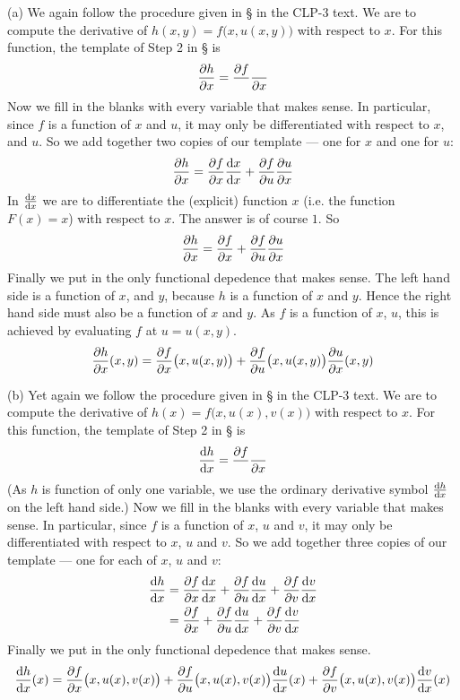 \begin{solution}
(a)
We again follow the procedure given in 
\S{} in the CLP-3 text. We are to compute the
derivative of $h(x,y)=f\big(x,u(x,y)\big)$ with respect to 
$x$. For this function, the template of Step 2 in 
\S{} is
\begin{equation*}
\pdiff{h}{x}=\frac{\partial f}{ }\frac{ }{\partial x}
\end{equation*}
Now we fill in the blanks with every variable that makes sense. In 
particular, since $f$ is a function of $x$ and $u$, it may only be 
differentiated with respect to $x$, and $u$. So we add together
two copies of our template --- one for $x$ and one for $u$:
\begin{align*}
\pdiff{h}{x}=\pdiff{f}{x}\diff{x}{x}
             +\pdiff{f}{u}\pdiff{u}{x}
\end{align*}
In $\diff{x}{x}$ we are to differentiate the (explicit) function $x$
(i.e. the function $F(x)=x$) with respect to $x$. The answer is of 
course $1$. So 
\begin{align*}
\pdiff{h}{x}=\pdiff{f}{x}
             +\pdiff{f}{u}\pdiff{u}{x}
\end{align*} 
Finally we put in the only functional depedence that makes sense. 
The left hand side is a function of $x$, and $y$, because $h$
is a function of $x$ and $y$. Hence the right hand side must 
also be a function of $x$ and $y$. As $f$ is a
function of $x$, $u$, this is achieved by evaluating $f$ at 
$u=u(x,y)$.
\begin{align*}
\pdiff{h}{x}(x,y)
=\pdiff{f}{x}\big(x,u(x,y)\big)
+\pdiff{f}{u}\big(x,u(x,y)\big)
\pdiff{u}{x}(x,y)
\end{align*}


(b) Yet again we follow the procedure given in 
\S{} in the CLP-3 text. We are to compute the
derivative of $h(x)=f\big(x,u(x),v(x)\big)$ with respect to 
$x$. For this function, the template of Step 2 in 
\S{} is
\begin{equation*}
\diff{h}{x}=\frac{\partial f}{ }\frac{ }{\partial x}
\end{equation*}
(As $h$ is function of only one variable, we use the ordinary derivative
symbol $\diff{h}{x}$ on the left hand side.)
Now we fill in the blanks with every variable that makes sense. In 
particular, since $f$ is a function of $x$, $u$ and $v$, it may only be 
differentiated with respect to $x$, $u$ and $v$. So we add together
three copies of our template --- one for each of $x$, $u$ and $v$:
\begin{align*}
\diff{h}{x}&=\pdiff{f}{x}\diff{x}{x}
             +\pdiff{f}{u}\diff{u}{x}
             +\pdiff{f}{v}\diff{v}{x} \\
            &=\pdiff{f}{x}
             +\pdiff{f}{u}\diff{u}{x}
             +\pdiff{f}{v}\diff{v}{x}
\end{align*}
Finally we put in the only functional depedence that makes sense. 
\begin{align*}
\diff{h}{x}(x)
=\pdiff{f}{x}\big(x,u(x),v(x)\big)
+\pdiff{f}{u}\big(x,u(x),v(x)\big)
\diff{u}{x}(x)
+\pdiff{f}{v}\big(x,u(x),v(x)\big)
\diff{v}{x}(x)
\end{align*}


\end{solution}

